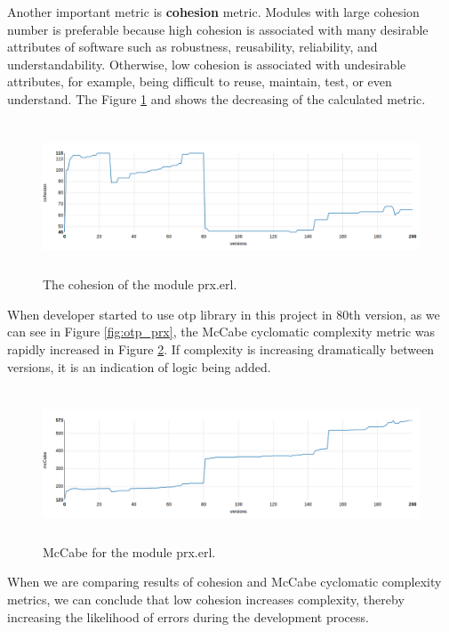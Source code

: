 Another important metric is \textbf{cohesion} metric. Modules with large cohesion number is preferable because high cohesion is associated with many desirable attributes of software such as robustness, reusability, reliability, and understandability. Otherwise, low cohesion is associated with undesirable attributes, for example, being difficult to reuse, maintain, test, or even understand. The Figure \ref{fig:cohesion_prx} and shows the decreasing of the calculated metric. 

\begin{figure}[ht]
	\centering
	\includegraphics[height=45mm]{figures/cohesion_prx.png}
	\caption{The cohesion of the module prx.erl.}
	\label{fig:cohesion_prx}
\end{figure}

When developer started to use otp library in this project in 80th version, as we can see in Figure \ref{fig:otp_prx}, the McCabe cyclomatic complexity metric was rapidly increased in Figure \ref{fig:McCabe}. If complexity is increasing dramatically between versions, it is an indication of logic 
being added. 

\begin{figure}[ht]
	\centering
	\includegraphics[height=45mm]{figures/mccabe.png}
	\caption{McCabe for the module prx.erl.}
	\label{fig:McCabe}
\end{figure}

When we are comparing results of cohesion and McCabe cyclomatic complexity metrics, we can conclude that low cohesion increases complexity, thereby increasing the likelihood of errors during the development process.

